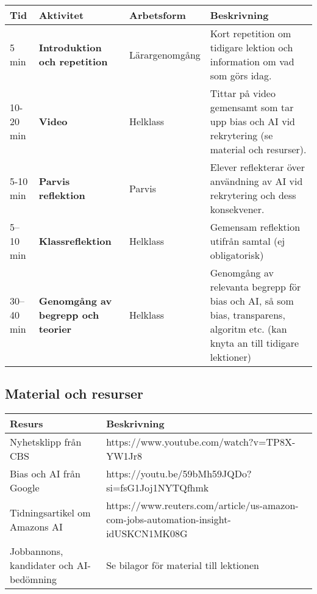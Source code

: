 \documentclass[12pt]{article}
\begin{document}
\begin{table}[h!]
    \centering
    \begin{tabularx}{\textwidth}{|p{2cm}|p{4cm}|p{3cm}|X|}
    \hline
    \rowcolor{gray!20} \textbf{Tid} & \textbf{Aktivitet} & \textbf{Arbetsform} & \textbf{Beskrivning} \\
    \hline
    5 min & \textbf{Introduktion och repetition} & Lärargenomgång &Kort repetition om  tidigare lektion och information om vad som görs idag.  \\
    \hline
    \rowcolor{gray!10} 10-20 min & \textbf{Video} & Helklass & Tittar på video gemensamt som tar upp bias och AI vid rekrytering (se material och resurser). \\
    \hline
    5-10 min & \textbf{Parvis reflektion} & Parvis & Elever reflekterar över användning av AI vid rekrytering och dess konsekvener. \\
    \hline
    \rowcolor{gray!10} 5--10 min & \textbf{Klassreflektion} & Helklass & Gemensam reflektion utifrån samtal (ej obligatorisk) \\
    \hline
    30--40 min & \textbf{Genomgång av begrepp och teorier} & Helklass & Genomgång av relevanta begrepp för bias och AI, så som bias, transparens, algoritm etc. (kan knyta an till tidigare lektioner) \\
    \hline
    \end{tabularx}
    \end{table}
    

\subsection*{Material och resurser}

\begin{table}[h!]
\centering
\begin{tabularx}{\textwidth}{|p{4cm}|X|}
\hline
\rowcolor{gray!20} \textbf{Resurs} & \textbf{Beskrivning} \\
\hline
\rowcolor{gray!10} Nyhetsklipp från CBS & https://www.youtube.com/watch?v=TP8X-YW1Jr8 \\
\hline
Bias och AI från Google & https://youtu.be/59bMh59JQDo?si=fsG1Joj1NYTQfhmk \\
\hline
\rowcolor{gray!10} Tidningsartikel om Amazons AI & https://www.reuters.com/article/us-amazon-com-jobs-automation-insight-idUSKCN1MK08G \\
\hline
Jobbannons, kandidater och AI-bedömning & Se bilagor för material till lektionen \\
\hline
\end{tabularx}
\end{table}
\end{document}
